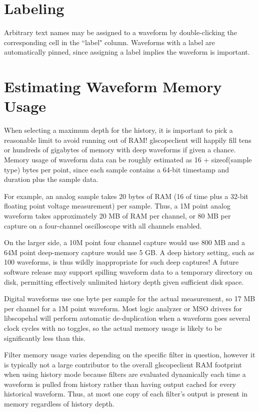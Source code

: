 \section{Labeling}

Arbitrary text names may be assigned to a waveform by double-clicking the corresponding cell in the ``label" column.
Waveforms with a label are automatically pinned, since assigning a label implies the waveform is important.

\section{Estimating Waveform Memory Usage}

When selecting a maximum depth for the history, it is important to pick a reasonable limit to avoid running out of RAM!
glscopeclient will happily fill tens or hundreds of gigabytes of memory with deep waveforms if given a chance. Memory
usage of waveform data can be roughly estimated as 16 + sizeof(sample type) bytes per point, since each sample contains a
64-bit timestamp and duration plus the sample data.

For example, an analog sample takes 20 bytes of RAM (16 of time plus a 32-bit floating point voltage measurement) per
sample. Thus, a 1M point analog waveform takes approximately 20 MB of RAM per channel, or 80 MB per capture on a
four-channel oscilloscope with all channels enabled.

On the larger side, a 10M point four channel capture would use 800 MB and a 64M point deep-memory capture would use 5
GB. A deep history setting, such as 100 waveforms, is thus wildly inappropriate for such deep captures! A future
software release may support spilling waveform data to a temporary directory on disk, permitting effectively unlimited
history depth given sufficient disk space.

Digital waveforms use one byte per sample for the actual measurement, so 17 MB per channel for a 1M point waveform.
Most logic analyzer or MSO drivers for libscopehal will perform automatic de-duplication when a waveform goes several
clock cycles with no toggles, so the actual memory usage is likely to be significantly less than this.

Filter memory usage varies depending on the specific filter in question, however it is typically not a large
contributor to the overall glscopeclient RAM footprint when using history mode because filters are evaluated
dynamically each time a waveform is pulled from history rather than having output cached for every historical waveform.
Thus, at most one copy of each filter's output is present in memory regardless of history depth.
